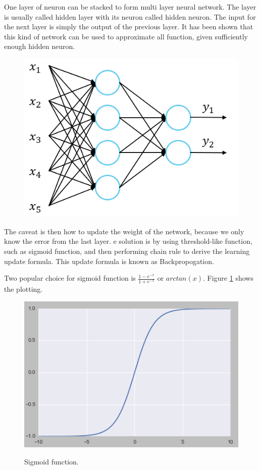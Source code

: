 \documentclass[a4paper,11pt]{kth-mag}
\begin{document}
One layer of neuron can be stacked to form multi layer neural network. The layer is usually called hidden layer with its neuron called hidden neuron. The input for the next layer is simply the output of the previous layer. It has been shown that this kind of network can be used to approximate all function, given sufficiently enough hidden neuron.

\begin{figure}
\centering
\includegraphics[scale=0.5]{image/multilayer.png}
\end{figure}

The caveat is then how to update the weight of the network, because we only know the error from the last layer. e solution is by using threshold-like function, such as sigmoid function, and then performing chain rule to derive the learning update formula. This update formula is known as Backpropogation.

Two popular choice for sigmoid function is $\frac{1-e^{-x}}{1+e^{-x}}$ or $arctan(x)$. Figure \ref{fig:sigmoid} shows the plotting.

\begin{figure}
\centering
\includegraphics[scale=0.5]{image/sigmoid.png}
\label{fig:sigmoid}
\caption{Sigmoid function.}
\end{figure}
\end{document}
